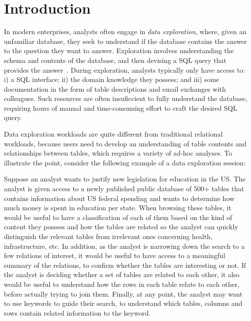 
\newcommand{\specialcell}[2][c]{%
  \begin{tabular}[#1]{@{}c@{}}#2\end{tabular}}

\section*{Introduction}
\label{introduction}

In modern enterprises, analysts often engage in \emph{data exploration}, where,
given an unfamiliar database, they seek to understand if the database contains
the answer to the question they want to answer. Exploration involves
understanding the schema and contents of the database, and then devising a SQL
query that provides the answer~\cite{dataexploration}.  During exploration,
analysts typically only have access to: i) a SQL interface; ii)
the domain knowledge they possess; and iii) some documentation in the form of
table descriptions and email exchanges with colleagues. Such resources are often
insuficcient to fully understand the database, requiring hours of manual and
time-consuming effort to craft the desired SQL query.

Data exploration workloads are quite different from traditional relational
workloads, because users need to develop an understanding of table contents
and relationships between tables, which requires a variety of ad-hoc analyses.
To illustrate the point, consider the following example of a data exploration
session:

Suppose an analyst wants to justify new legislation for education in the US.
The analyst is given access to a newly published public database of 500+ tables
that contains information about US federal spending and wants to determine how
much money is spent in education per state. When browsing these tables, it would
be useful to have a classification of each of them based on the kind of content
they possess and how the tables are related so the analyst can quickly
distinguish the relevant tables from irrelevant ones concerning health,
infrastructure, etc. In addition, as the analyst is narrowing down the search to
a few relations of interest, it would be useful to have access to a meaningful
summary of the relations, to confirm whether the tables are interesting or not.
If the analyst is deciding whether a set of tables are related to each other, it
also would be useful to understand how the rows in each table relate to each
other, before actually trying to join them. Finally, at any point, the analyst
may want to use keywords to guide their search, to understand which tables,
columns and rows contain related information to the keyword.

